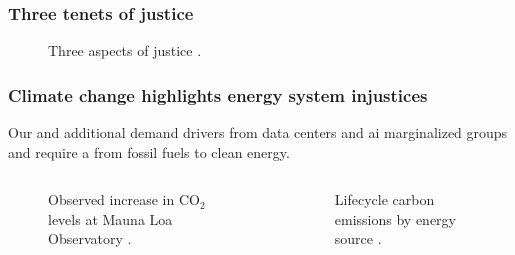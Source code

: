 \begin{frame}
    \frametitle{Three tenets of justice}
    \begin{figure}
        \centering

        \caption{Three aspects of justice \cite{schlosberg_1_2007}.}
    \end{figure}
\end{frame}

\begin{frame}
    \frametitle{Climate change highlights energy system injustices}
    Our  and additional demand drivers from data 
    centers and \gls{ai}  marginalized groups and require a  from fossil 
    fuels to clean energy.
    \begin{columns}
        \column[t]{5cm}
        \begin{figure}
            \centering
            \resizebox{\columnwidth}{!}{}
            \caption{Observed increase in CO$_2$ levels at Mauna Loa Observatory
            \cite{kane_atmospheric_1996}.}
            \label{figure:mauna-loa}
        \end{figure}
        
        \column[t]{5cm}
        \begin{figure}
            \centering
            \resizebox{\columnwidth}{!}{}
            \caption{Lifecycle carbon emissions by energy source
            \cite{united_nations_economic_commission_for_europe_carbon_2022}.}
            \label{figure:energy-emissions}
        \end{figure}
    \end{columns}

\end{frame}

